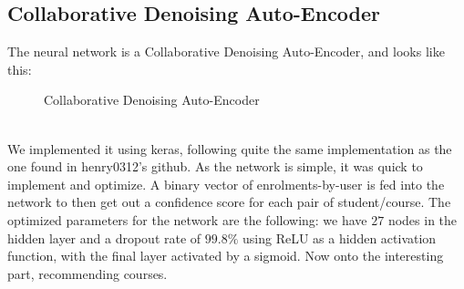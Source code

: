\documentclass{article}
\begin{document}
    \subsection{Collaborative Denoising Auto-Encoder}
        The neural network is a Collaborative Denoising Auto-Encoder\cite{cdae}, and looks like this:
\\\begin{figure}[h]
\centering
{}
  \caption{Collaborative Denoising Auto-Encoder}
  \label{fig:cdae_layers}
\end{figure}
        \\We implemented it using keras, following quite the same implementation as the one found in henry0312's github\cite{cdaegithub}. As the network is simple, it was quick to implement and optimize. A binary vector of enrolments-by-user is fed into the network to then get out a confidence score for each pair of student/course. The optimized parameters for the network are the following: we have $27$ nodes in the hidden layer and a dropout rate of $99.8\%$ using ReLU as a hidden activation function, with the final layer activated by a sigmoid. Now onto the interesting part, recommending courses.

    \newpage
\end{document}
